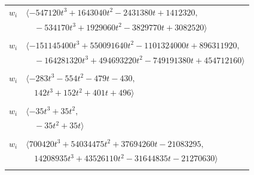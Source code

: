 \documentclass[11pt]{article}
\begin{document}
\begin{longtable}{@{}ll@{}}
$w_i$ & $\langle -547120t^{3}+1643040t^{2}-2431380t+1412320,$\\
 & $\quad -534170t^{3}+1929060t^{2}-3829770t+3082520\rangle$\\
\addlinespace[2pt]
\multicolumn{2}{@{}p{0.97\textwidth}@{}}{$i=42$, $D_i=1$, $\rho_{ij}$: $0{:}1, \allowbreak 5{:}1, \allowbreak 8{:}2, \allowbreak 12{:}2, \allowbreak 15{:}2, \allowbreak 17{:}1, \allowbreak 19{:}2, \allowbreak 21{:}2, \allowbreak 34{:}2, \allowbreak 40{:}1, \allowbreak 41{:}2, \allowbreak 55{:}2, \allowbreak 69{:}2, \allowbreak 73{:}1, \allowbreak 75{:}2, \allowbreak 76{:}1, \allowbreak 79{:}2, \allowbreak 87{:}2, \allowbreak 97{:}1$}\\
$w_i$ & $\langle -151145400t^{3}+550091640t^{2}-1101324000t+896311920,$\\
 & $\quad -164281320t^{3}+494693220t^{2}-749191380t+454712160\rangle$\\
\addlinespace[2pt]
\multicolumn{2}{@{}p{0.97\textwidth}@{}}{$i=43$, $D_i=1$, $\rho_{ij}$: $4{:}2, \allowbreak 5{:}2, \allowbreak 6{:}2, \allowbreak 16{:}2, \allowbreak 18{:}2, \allowbreak 21{:}2, \allowbreak 23{:}1, \allowbreak 27{:}1, \allowbreak 30{:}1, \allowbreak 31{:}1, \allowbreak 37{:}1, \allowbreak 45{:}2$}\\
$w_i$ & $\langle -283t^{3}-554t^{2}-479t-430,$\\
 & $\quad 142t^{3}+152t^{2}+401t+496\rangle$\\
\addlinespace[2pt]
\multicolumn{2}{@{}p{0.97\textwidth}@{}}{$i=44$, $D_i=1$, $\rho_{ij}$: $0{:}2, \allowbreak 1{:}1, \allowbreak 6{:}2, \allowbreak 16{:}1, \allowbreak 19{:}1, \allowbreak 24{:}2, \allowbreak 37{:}1$}\\
$w_i$ & $\langle -35t^{3}+35t^{2},$\\
 & $\quad -35t^{2}+35t\rangle$\\
\addlinespace[2pt]
\multicolumn{2}{@{}p{0.97\textwidth}@{}}{$i=45$, $D_i=1$, $\rho_{ij}$: $4{:}1, \allowbreak 5{:}1, \allowbreak 9{:}1, \allowbreak 10{:}1, \allowbreak 11{:}2, \allowbreak 15{:}1, \allowbreak 19{:}1, \allowbreak 21{:}1, \allowbreak 26{:}1, \allowbreak 27{:}2, \allowbreak 31{:}1, \allowbreak 39{:}1, \allowbreak 41{:}2, \allowbreak 43{:}1, \allowbreak 47{:}2, \allowbreak 52{:}2$}\\
$w_i$ & $\langle 700420t^{3}+54034475t^{2}+37694260t-21083295,$\\
 & $\quad 14208935t^{3}+43526110t^{2}-31644835t-21270630\rangle$\\
\addlinespace[2pt]
\multicolumn{2}{@{}p{0.97\textwidth}@{}}{$i=46$, $D_i=1$, $\rho_{ij}$: $--$}\\

\end{longtable}
\end{document}
